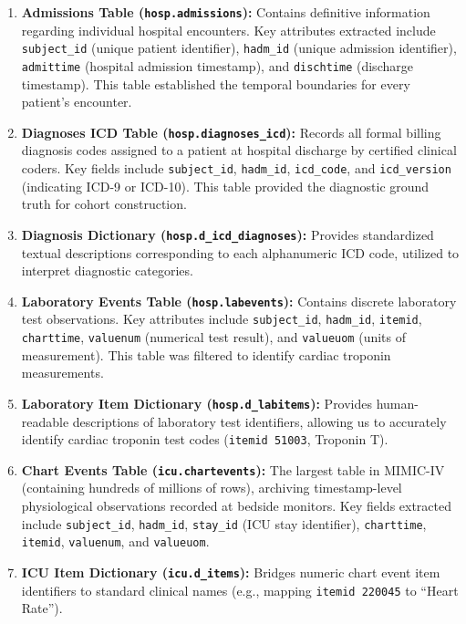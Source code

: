 \begin{enumerate}
    \item \textbf{Admissions Table (\texttt{hosp.admissions}):} Contains definitive information regarding individual hospital encounters. Key attributes extracted include \texttt{subject\_id} (unique patient identifier), \texttt{hadm\_id} (unique admission identifier), \texttt{admittime} (hospital admission timestamp), and \texttt{dischtime} (discharge timestamp). This table established the temporal boundaries for every patient's encounter.
    
    \item \textbf{Diagnoses ICD Table (\texttt{hosp.diagnoses\_icd}):} Records all formal billing diagnosis codes assigned to a patient at hospital discharge by certified clinical coders. Key fields include \texttt{subject\_id}, \texttt{hadm\_id}, \texttt{icd\_code}, and \texttt{icd\_version} (indicating ICD-9 or ICD-10). This table provided the diagnostic ground truth for cohort construction.
    
    \item \textbf{Diagnosis Dictionary (\texttt{hosp.d\_icd\_diagnoses}):} Provides standardized textual descriptions corresponding to each alphanumeric ICD code, utilized to interpret diagnostic categories.
    
    \item \textbf{Laboratory Events Table (\texttt{hosp.labevents}):} Contains discrete laboratory test observations. Key attributes include \texttt{subject\_id}, \texttt{hadm\_id}, \texttt{itemid}, \texttt{charttime}, \texttt{valuenum} (numerical test result), and \texttt{valueuom} (units of measurement). This table was filtered to identify cardiac troponin measurements.
    
    \item \textbf{Laboratory Item Dictionary (\texttt{hosp.d\_labitems}):} Provides human-readable descriptions of laboratory test identifiers, allowing us to accurately identify cardiac troponin test codes (\texttt{itemid 51003}, Troponin T).
    
    \item \textbf{Chart Events Table (\texttt{icu.chartevents}):} The largest table in MIMIC-IV (containing hundreds of millions of rows), archiving timestamp-level physiological observations recorded at bedside monitors. Key fields extracted include \texttt{subject\_id}, \texttt{hadm\_id}, \texttt{stay\_id} (ICU stay identifier), \texttt{charttime}, \texttt{itemid}, \texttt{valuenum}, and \texttt{valueuom}.
    
    \item \textbf{ICU Item Dictionary (\texttt{icu.d\_items}):} Bridges numeric chart event item identifiers to standard clinical names (e.g., mapping \texttt{itemid 220045} to ``Heart Rate'').
\end{enumerate}

